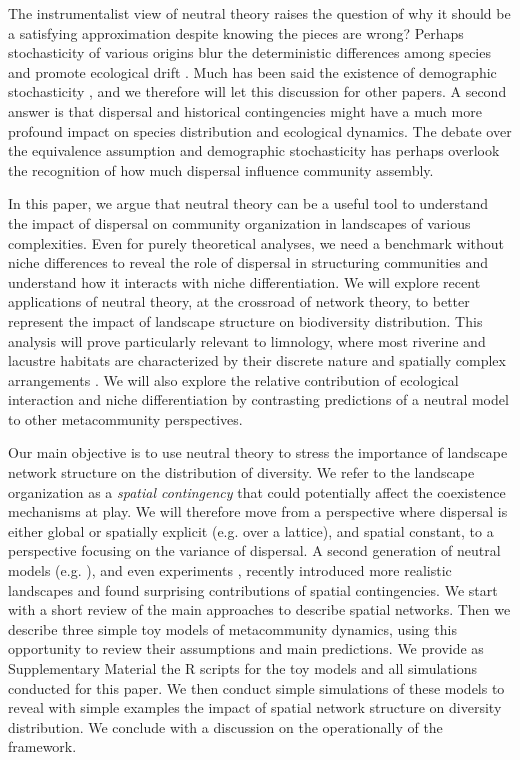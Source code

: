 \documentclass[12pt]{article}
\begin{document}
The instrumentalist view of neutral theory raises the question of why it should
be a satisfying approximation despite knowing the pieces are wrong? Perhaps
stochasticity of various origins blur the deterministic differences among
species and promote ecological drift \parencite{Gravel2011a}. Much has been said
the existence of demographic stochasticity \parencite{Clark2012}, and we
therefore will let this discussion for other papers. A second answer is that
dispersal and historical contingencies might have a much more profound impact on
species distribution \parencite{Bahn2007, Boulangeat2012} and ecological
dynamics. The debate over the equivalence assumption and demographic
stochasticity has perhaps overlook the recognition of how much dispersal
influence community assembly.

In this paper, we argue that neutral theory can be a useful tool to understand
the impact of dispersal on community organization in landscapes of various
complexities. Even for purely theoretical analyses, we need a benchmark without
niche differences to reveal the role of dispersal in structuring communities and
understand how it interacts with niche differentiation. We will explore recent
applications of neutral theory, at the crossroad of network theory, to better
represent the impact of landscape structure on biodiversity distribution. This
analysis will prove particularly relevant to limnology, where most riverine and
lacustre habitats are characterized by their discrete nature and spatially
complex arrangements \parencite{Peterson2013}. We will also explore the relative
contribution of ecological interaction and niche differentiation by contrasting
predictions of a neutral model to other metacommunity perspectives.

Our main objective is to use neutral theory to stress the importance of
landscape network structure on the distribution of diversity. We refer to the
landscape organization as a \emph{spatial contingency} \parencite{Peres-Neto2012}
that could potentially affect the coexistence mechanisms at play. We will
therefore move from a perspective where dispersal is either global or spatially
explicit (e.g. over a lattice), and spatial constant, to a perspective focusing
on the variance of dispersal. A second generation of neutral models (e.g.
\textcite{Economo2008, Economo2011,Desjardins2012a,Desjardins2012b}), and even
experiments \parencite{Carrara2012}, recently introduced more realistic
landscapes and found surprising contributions of spatial contingencies. We start
with a short review of the main approaches to describe spatial networks. Then we
describe three simple toy models of metacommunity dynamics, using this
opportunity to review their assumptions and main predictions. We provide as
Supplementary Material the R scripts for the toy models and all simulations
conducted for this paper. We then conduct simple simulations of these models to
reveal with simple examples the impact of spatial network structure on diversity
distribution. We conclude with a discussion on the operationally of the
framework.
\end{document}
